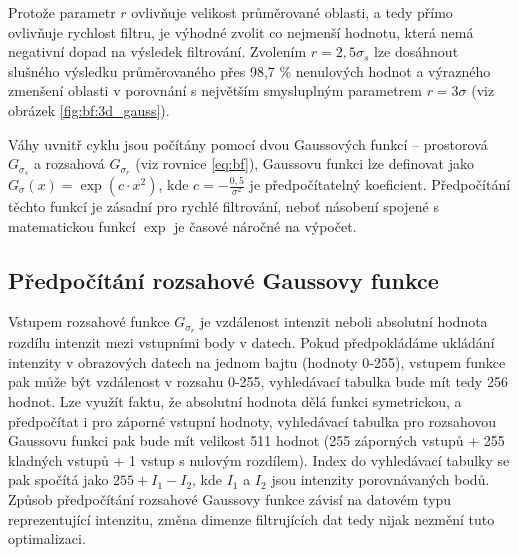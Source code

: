 Protože parametr $r$ ovlivňuje velikost průměrované oblasti, a tedy přímo ovlivňuje rychlost filtru, je výhodné zvolit co nejmenší hodnotu, která nemá negativní dopad na výsledek filtrování. Zvolením $r = 2,5\sigma_s$ lze dosáhnout slušného výsledku průměrovaného přes 98,7 \% nenulových hodnot \cite{wiki:integral_image} a výrazného zmenšení oblasti v porovnání s největším smysluplným parametrem $r = 3\sigma$ (viz obrázek \ref{fig:bf:3d_gauss}).

Váhy uvnitř cyklu jsou počítány pomocí dvou Gaussových funkcí -- prostorová $G_{\sigma_s}$ a rozsahová $G_{\sigma_r}$ (viz rovnice \ref{eq:bf}), Gaussovu funkci lze definovat jako $G_\sigma(x)=\exp(c \cdot x^2)$, kde $c=-\frac{0,5}{\sigma^2}$ je předpočítatelný koeficient. Předpočítání těchto funkcí je zásadní pro rychlé filtrování, neboť násobení spojené s matematickou funkcí $\exp$ je časové náročné na výpočet. 

\subsection*{Předpočítání rozsahové Gaussovy funkce}
Vstupem rozsahové funkce $G_{\sigma_r}$ je vzdálenost intenzit neboli absolutní hodnota rozdílu intenzit mezi vstupními body v datech. Pokud předpokládáme ukládání intenzity v obrazových datech na jednom bajtu (hodnoty 0-255), vstupem funkce pak může být vzdálenost v rozsahu 0-255, vyhledávací tabulka bude mít tedy 256 hodnot. Lze využít faktu, že absolutní hodnota dělá funkci symetrickou, a předpočítat i pro záporné vstupní hodnoty, vyhledávací tabulka pro rozsahovou Gaussovu funkci pak bude mít velikost 511 hodnot (255 záporných vstupů + 255 kladných vstupů + 1 vstup s nulovým rozdílem). Index do vyhledávací tabulky se pak spočítá jako $255 + I_1 - I_2$, kde $I_1$ a $I_2$ jsou intenzity porovnávaných bodů. Způsob předpočítání rozsahové Gaussovy funkce závisí na datovém typu reprezentující intenzitu, změna dimenze filtrujících dat tedy nijak nezmění tuto optimalizaci.

